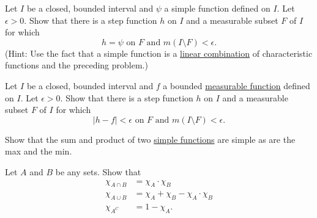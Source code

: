   \begin{exercise}[Royden 3.17]
    Let $I$ be a closed, bounded interval and $\psi$ a simple function defined on $I$. Let $\epsilon > 0$. Show that there is a step function $h$ on $I$ and a measurable subset $F$ of $I$ for which
    \begin{equation*}
      h = \psi \text{ on } F \text{ and } m(I \setminus F) < \epsilon.
    \end{equation*}
    (Hint: Use the fact that a simple function is a \hyperref[lin-def:linear-combination]{linear combination} of characteristic functions and the preceding problem.)
  \end{exercise}

  \begin{exercise}[Royden 3.18]
    Let $I$ be a closed, bounded interval and $f$ a bounded \hyperref[def:measurable-function]{measurable function} defined on $I$. Let $\epsilon > 0$. Show that there is a step function $h$ on $I$ and a measurable subset $F$ of $I$ for which
    \begin{equation*}
      |h - f| < \epsilon \text{ on } F \text{ and } m(I \setminus F) < \epsilon.
    \end{equation*}
  \end{exercise}

  \begin{exercise}[Royden 3.19]
    Show that the sum and product of two \hyperref[def:simple-functions]{simple functions} are simple as are the max and the min.
  \end{exercise}

  \begin{exercise}[Royden 3.20]
    Let $A$ and $B$ be any sets. Show that
    \begin{align*}
      \chi_{A \cap B} &= \chi_A \cdot \chi_B \\
      \chi_{A \cup B} &= \chi_A + \chi_B - \chi_A \cdot \chi_B \\
      \chi_{A^C} &= 1 - \chi_A.
    \end{align*}
  \end{exercise}


